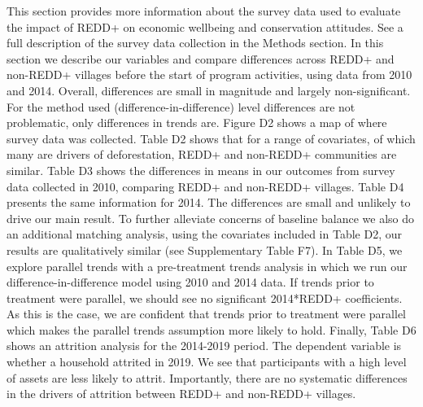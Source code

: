 \documentclass[
]{article}
\begin{document}
This section provides more information about the survey data used to
evaluate the impact of REDD+ on economic wellbeing and conservation
attitudes. See a full description of the survey data collection in the
Methods section. In this section we describe our variables and compare
differences across REDD+ and non-REDD+ villages before the start of
program activities, using data from 2010 and 2014. Overall, differences
are small in magnitude and largely non-significant. For the method used
(difference-in-difference) level differences are not problematic, only
differences in trends are. Figure D2 shows a map of where survey data
was collected. Table D2 shows that for a range of covariates, of which
many are drivers of deforestation, REDD+ and non-REDD+ communities are
similar. Table D3 shows the differences in means in our outcomes from
survey data collected in 2010, comparing REDD+ and non-REDD+ villages.
Table D4 presents the same information for 2014. The differences are
small and unlikely to drive our main result. To further alleviate
concerns of baseline balance we also do an additional matching analysis,
using the covariates included in Table D2, our results are qualitatively
similar (see Supplementary Table F7). In Table D5, we explore parallel
trends with a pre-treatment trends analysis in which we run our
difference-in-difference model using 2010 and 2014 data. If trends prior
to treatment were parallel, we should see no significant 2014*REDD+
coefficients. As this is the case, we are confident that trends prior to
treatment were parallel which makes the parallel trends assumption more
likely to hold. Finally, Table D6 shows an attrition analysis for the
2014-2019 period. The dependent variable is whether a household attrited
in 2019. We see that participants with a high level of assets are less
likely to attrit. Importantly, there are no systematic differences in
the drivers of attrition between REDD+ and non-REDD+ villages.
\end{document}
